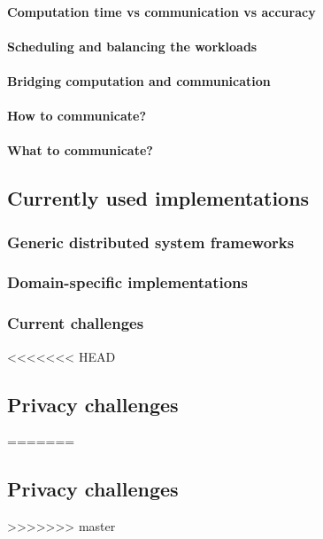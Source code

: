 \paragraph{Computation time vs communication vs accuracy}
\paragraph{Scheduling and balancing the workloads}
\paragraph{Bridging computation and communication}
\paragraph{How to communicate?}
\paragraph{What to communicate?}










\subsection{Currently used implementations}
\subsubsection{Generic distributed system frameworks}
\subsubsection{Domain-specific implementations}
\subsubsection{Current challenges}










<<<<<<< HEAD
\subsection{Privacy challenges}
=======
\subsection{Privacy challenges}
>>>>>>> master
